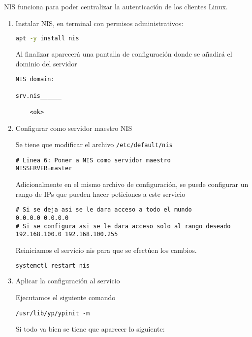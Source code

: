 \documentclass[../main.tex]{subfiles}
\begin{document}
NIS funciona para poder centralizar la autenticación de los clientes Linux.

\begin{enumerate}
\item Instalar NIS, en terminal con permisos administrativos:

  \begin{lstlisting}[language=bash]
apt -y install nis
  \end{lstlisting}

  Al finalizar aparecerá una pantalla de configuración donde se
  añadirá el dominio del servidor

  \begin{lstlisting}
NIS domain:

srv.nis______

    <ok>
\end{lstlisting}
  
\item Configurar como servidor maestro NIS

  Se tiene que modificar el archivo \lstinline|/etc/default/nis|

  \begin{lstlisting}
# Linea 6: Poner a NIS como servidor maestro
NISSERVER=master
\end{lstlisting}

  Adicionalmente en el mismo archivo de configuración, se puede
  configurar un rango de IPs que pueden hacer peticiones
  a este servicio

  \begin{lstlisting}
# Si se deja asi se le dara acceso a todo el mundo
0.0.0.0 0.0.0.0
# Si se configura asi se le dara acceso solo al rango deseado
192.168.100.0 192.168.100.255
\end{lstlisting}

  Reiniciamos el servicio nis para que se efectúen los cambios.

  \begin{lstlisting}[language=bash]
systemctl restart nis
\end{lstlisting}

  
\item Aplicar la configuración al servicio

  Ejecutamos el siguiente comando

  \begin{lstlisting}
/usr/lib/yp/ypinit -m
\end{lstlisting}

  Si todo va bien se tiene que aparecer lo siguiente:


\end{enumerate}
\end{document}
